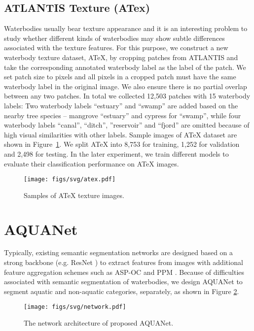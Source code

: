 \documentclass{article}
\begin{document}
\subsection{ATLANTIS Texture (ATex)}
Waterbodies usually bear texture appearance and it is an interesting problem to study whether different kinds of waterbodies may show subtle differences associated with the texture features. For this purpose, we construct a new waterbody texture dataset, ATeX, by cropping patches from ATLANTIS and take the corresponding annotated waterbody label as the label of the patch. We set patch size to  pixels and all pixels in a cropped patch must have the same waterbody label in the original image. We also ensure there is no partial overlap between any two patches. In total we collected 12,503 patches with 15 waterbody labels: Two waterbody labels ``estuary'' and ``swamp'' are added based on the nearby tree species -- mangrove ``estuary'' and cypress for ``swamp'', while four waterbody labels ``canal'', ``ditch'', ''reservoir'' and ``fjord'' are omitted because of high visual similarities with other labels. Sample images of ATeX dataset are shown in Figure~\ref{fig:atex}. We split ATeX into 8,753 for training, 1,252 for validation and 2,498 for testing. In the later experiment, we train different models to evaluate their classification performance on ATeX images.

\begin{figure}[ht]
    \centering
    \texttt{[image: figs/svg/atex.pdf]}
    \caption{Samples of ATeX texture images.}
    \label{fig:atex}
\end{figure}

\section{AQUANet}
Typically, existing semantic segmentation networks are designed based on a strong backbone (e.g. ResNet \cite{he2016deep}) to extract features from images with additional feature aggregation schemes such as ASP-OC \cite{YuanW18} and PPM \cite{zhao2017pyramid}.
Because of difficulties associated with semantic segmentation of waterbodies, we design AQUANet to segment aquatic and non-aquatic categories, separately, as shown in Figure \ref{fig:nework}. 

\begin{figure}[ht]
	\centering
	\texttt{[image: figs/svg/network.pdf]}
	\caption{The network architecture of proposed AQUANet.}
	\label{fig:nework}
\end{figure}
\end{document}
